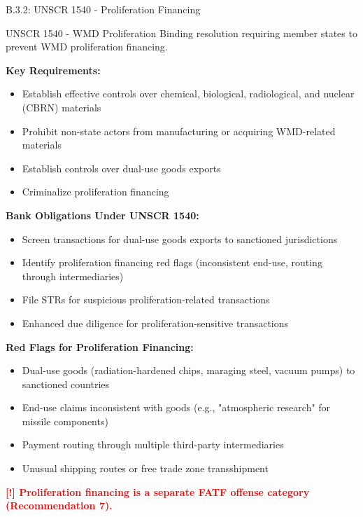 \documentclass[11pt,a4paper]{beamer}
\newcommand{\redflag}[1]{\textcolor{red}{\textbf{[!] #1}}}
\begin{document}
	\begin{frame}{B.3.2: UNSCR 1540 - Proliferation Financing}
		\begin{block}{UNSCR 1540 - WMD Proliferation}
			Binding resolution requiring member states to prevent WMD proliferation financing.
		\end{block}
		\textbf{Key Requirements:}
		\begin{itemize}
			\item Establish effective controls over chemical, biological, radiological, and nuclear (CBRN) materials
			\item Prohibit non-state actors from manufacturing or acquiring WMD-related materials
			\item Establish controls over dual-use goods exports
			\item Criminalize proliferation financing
		\end{itemize}
		\textbf{Bank Obligations Under UNSCR 1540:}
		\begin{itemize}
			\item Screen transactions for dual-use goods exports to sanctioned jurisdictions
			\item Identify proliferation financing red flags (inconsistent end-use, routing through intermediaries)
			\item File STRs for suspicious proliferation-related transactions
			\item Enhanced due diligence for proliferation-sensitive transactions
		\end{itemize}
		\textbf{Red Flags for Proliferation Financing:}
		\begin{itemize}
			\item Dual-use goods (radiation-hardened chips, maraging steel, vacuum pumps) to sanctioned countries
			\item End-use claims inconsistent with goods (e.g., "atmospheric research" for missile components)
			\item Payment routing through multiple third-party intermediaries
			\item Unusual shipping routes or free trade zone transshipment
		\end{itemize}
		\redflag{Proliferation financing is a separate FATF offense category (Recommendation 7).}
	\end{frame}
	
	
\end{document}
